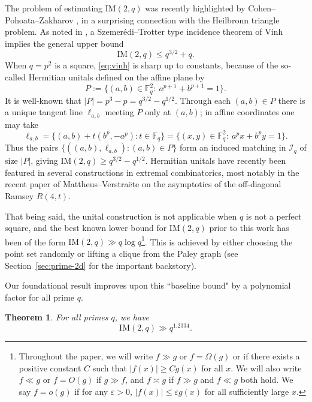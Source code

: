 \documentclass[12pt,reqno]{amsart}
\theoremstyle{plain}
\newtheorem{theorem}{Theorem}[section]
\theoremstyle{definition}
\newcommand{\F}{\mathbb{F}}
\newcommand{\IM}{\mathrm{IM}}
\newcommand{\II}{\mathcal{I}}
\newcommand{\1}{\mathbf{1}}
\begin{document}
The problem of estimating $\IM(2, q)$ was recently highlighted by Cohen--Pohoata--Zakharov \cite{CPZ}, in a surprising connection with the Heilbronn triangle problem. As noted in \cite[\S1.5]{CPZ}, a Szemer\'edi--Trotter type incidence theorem of Vinh
\cite{Vinh2011ST} implies the general upper bound
\begin{equation}\label{eq:vinh}
  \IM(2,q) \le q^{3/2}+q.
\end{equation}
When $q = p^2$ is a square, \eqref{eq:vinh} is sharp up to constants, because of the so-called Hermitian unitals defined on the affine plane by
\begin{equation}\label{eq:hermitian-curve}
  P:=\{(a,b)\in\F_q^2:\ a^{p+1}+b^{p+1}=1\}.
\end{equation}
It is well-known that $|P|=p^{3}-p=q^{3/2}-q^{1/2}$. Through each $(a,b)\in P$
there is a unique tangent line $\ell_{a,b}$ meeting $P$ only at $(a,b)$; in affine coordinates one may take
\begin{equation}\label{eq:hermitian-tangent}
  \ell_{a,b}=\{(a,b)+t(b^{p},-a^{p}): t\in\F_q\}
  =\{(x,y)\in\F_q^2:\ a^{p}x+b^{p}y=1\}.
\end{equation}
Thus the pairs $\{((a,b),\ell_{a,b}): (a,b) \in P\}$ form an induced matching in $\II_q$ of size $|P|$, giving
$\IM(2,q)\ge q^{3/2}-q^{1/2}$. Hermitian unitals have recently been featured in several constructions in extremal combinatorics, most notably in the recent paper of Mattheus--Verstra\"ete \cite{MV} on the asymptotics of the off-diagonal Ramsey $R(4,t)$. 

That being said, the unital construction is not applicable when $q$ is not a perfect square, and the best known lower bound for $\IM(2,q)$ prior to this work has been of the form $\IM(2,q) \gg q \log q$\footnote{Throughout the paper, we will write $f\gg g$ or $f = \Omega(g)$ or if there exists a positive constant $C$ such that $|f(x)|\geq C g(x)$ for all $x$. We will also write $f \ll g$ or $f = O(g)$ if $g \gg f$, and $f\asymp g$ if $f \gg g$ and $f \ll g$ both hold. We say $f= o(g)$ if for any $\varepsilon>0$, $|f(x)|\le \varepsilon g(x)$ for all sufficiently large $x$.}. This is achieved by either choosing the point set randomly or lifting a clique from the Paley graph (see Section~\ref{sec:prime-2d} for the important backstory).

Our foundational result improves upon this ``baseline bound" by a polynomial factor for all prime $q$. 

\begin{theorem}\label{thm:d=2}
For all primes $q$, we have
\[
  \IM(2,q) \gg q^{1.2334}.
\]
\end{theorem}
\end{document}

